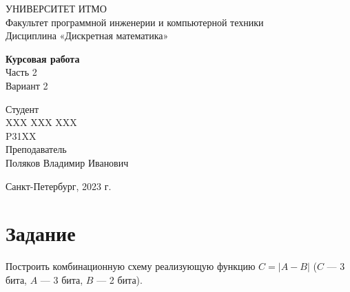 \documentclass{article}
\begin{document}
\begin{center}
    УНИВЕРСИТЕТ ИТМО \\
    Факультет программной инженерии и компьютерной техники \\
    Дисциплина «Дискретная математика»
    
    \vspace{5cm}

    \large
    \textbf{Курсовая работа} \\
    Часть 2 \\
    Вариант 2
\end{center}

\vspace{2cm}

\hfill\begin{minipage}{0.35\linewidth}
Студент \\
XXX XXX XXX \\
P31XX \\

Преподаватель \\
Поляков Владимир Иванович
\end{minipage}

\vfill

\begin{center}
    Санкт-Петербург, 2023 г.
\end{center}

\thispagestyle{empty}
\newpage

\section*{Задание}
Построить комбинационную схему реализующую функцию $C = |A - B|$ ($C$ --- 3 бита, $A$ --- 3 бита, $B$ --- 2 бита).
\end{document}
